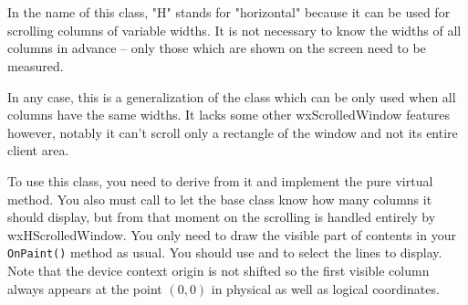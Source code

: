 
\section{}\label{wxhscrolledwindow}

In the name of this class, "H" stands for "horizontal" because it can be
used for scrolling columns of variable widths. It is not necessary to know
the widths of all columns in advance -- only those which are shown on the
screen need to be measured.

In any case, this is a generalization of the
 class which can be only used when
all columns have the same widths. It lacks some other wxScrolledWindow features
however, notably it can't scroll only a rectangle of the window and not its
entire client area.

To use this class, you need to derive from it and implement the
 pure virtual
method. You also must call 
to let the base class know how many columns it should display, but from that
moment on the scrolling is handled entirely by wxHScrolledWindow. You only
need to draw the visible part of contents in your {\tt OnPaint()} method as
usual. You should use 
and  to
select the lines to display. Note that the device context origin is not shifted
so the first visible column always appears at the point $(0, 0)$ in physical as
well as logical coordinates.


\\
\\
\\

\\

